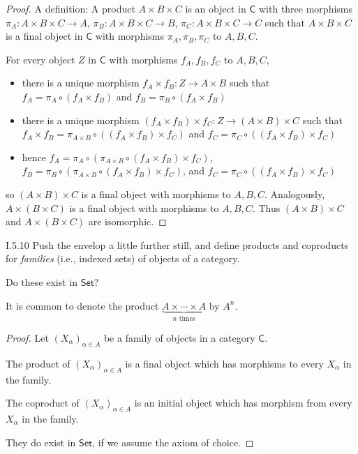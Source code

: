 \begin{proof}
	A definition: A product $A\times B\times C$ is an object in $\mathsf{C}$ with three morphisms $\pi_{A}: A\times B\times C\to A$, $\pi_{B}: A\times B\times C\to B$, $\pi_{C}: A\times B\times C\to C$ such that $A\times B\times C$ is a final object in $\mathsf{C}$ with morphisms $\pi_{A}, \pi_{B}, \pi_{C}$ to $A, B, C$.

	For every object $Z$ in $\mathsf{C}$ with morphisms $f_{A}, f_{B}, f_{C}$ to $A, B, C$,
	\begin{itemize}
		\item there is a unique morphism $f_{A}\times f_{B}: Z\to A\times B$ such that $f_{A} = \pi_{A} \circ (f_{A}\times f_{B})$ and $f_{B} = \pi_{B} \circ (f_{A}\times f_{B})$
		\item there is a unique morphism $(f_{A}\times f_{B})\times f_{C}: Z \to (A\times B)\times C$ such that $f_{A}\times f_{B} = \pi_{A\times B}\circ ((f_{A}\times f_{B})\times f_{C})$ and $f_{C} = \pi_{C}\circ ((f_{A}\times f_{B})\times f_{C})$
		\item hence $f_{A} = \pi_{A}\circ (\pi_{A\times B}\circ (f_{A}\times f_{B})\times f_{C})$, $f_{B} = \pi_{B}\circ (\pi_{A\times B}\circ (f_{A}\times f_{B})\times f_{C})$, and $f_{C} = \pi_{C}\circ ((f_{A}\times f_{B})\times f_{C})$
	\end{itemize}

	so $(A\times B)\times C$ is a final object with morphisms to $A, B, C$. Analogously, $A\times (B\times C)$ is a final object with morphisms to $A, B, C$. Thus $(A\times B)\times C$ and $A\times (B\times C)$ are isomorphic.
\end{proof}

\begin{exercise}{I.5.10}
	Push the envelop a little further still, and define products and coproducts for \textit{families} (i.e., indexed sets) of objects of a category.

	Do these exist in $\mathsf{Set}$?

	It is common to denote the product $\underbrace{A\times \cdots \times A}_{\text{$n$ times}}$ by $A^{n}$.
\end{exercise}

\begin{proof}
	Let ${(X_{\alpha})}_{\alpha\in A}$ be a family of objects in a category $\mathsf{C}$.

	The product of ${(X_{\alpha})}_{\alpha\in A}$ is a final object which has morphisms to every $X_{\alpha}$ in the family.

	The coproduct of ${(X_{\alpha})}_{\alpha\in A}$ is an initial object which has morphism from every $X_{\alpha}$ in the family.

	They do exist in $\mathsf{Set}$, if we assume the axiom of choice.
\end{proof}

